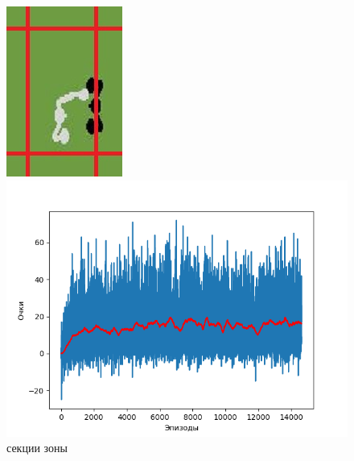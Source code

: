 \documentclass{letask}
\begin{document}
\begin{figure}[H]
\begin{center}
\begin{minipage}[h]{0.3\linewidth}
\includegraphics[width=1\linewidth]{observation_zones.jpg}
\caption{секции зоны}
\label{observation_zones}
\end{minipage}
\hfill
\begin{minipage}[h]{0.6\linewidth}
\includegraphics[width=1\linewidth]{q_learning_graph.png}

\end{minipage}
\end{center}
\end{figure}
\end{document}
